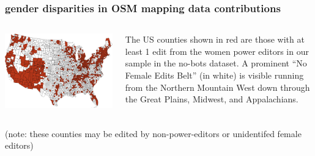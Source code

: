 \documentclass[presentation]{subfiles}
\begin{document}
\begin{frame}[b,label=mapped]\frametitle{gender disparities in OSM mapping data contributions}
    

\begin{columns}
\begin{column}{0.6\textwidth}
\includegraphics[width=\textwidth]{figures/disparity_alpha.png}
\end{column}

\begin{column}{0.45\textwidth}
{\small The US counties shown in red are those with at least 1 edit from the women power editors in our sample in the no-bots dataset. A prominent ``No Female Edits Belt'' (in white) is visible running from the Northern Mountain West down through the Great Plains, Midwest, and Appalachians.

}
\end{column}
\end{columns}
\hfill {\scriptsize (note: these counties may be edited by non-power-editors or unidentifed female editors)}

\end{frame}
\end{document}
